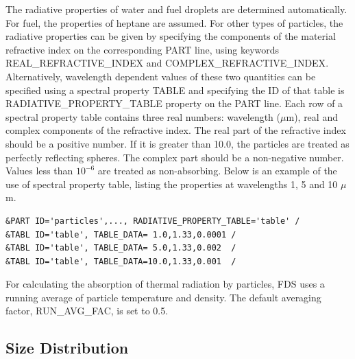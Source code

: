 \documentclass[11pt]{book}
\begin{document}
The radiative properties of water and fuel droplets are determined automatically.
For fuel, the properties of heptane are assumed. For other types of particles, the
radiative properties can be given by specifying the components of the material refractive index on the corresponding {\ct PART} line, using keywords
{\ct REAL\_REFRACTIVE\_INDEX} and {\ct COMPLEX\_REFRACTIVE\_INDEX}. Alternatively, wavelength dependent values of these two quantities can be specified using
a spectral property {\ct TABLE} and specifying the {\ct ID} of that table is {\ct RADIATIVE\_PROPERTY\_TABLE} property on the {\ct PART} line.
Each row of a spectral property table contains three real numbers: wavelength ($\mu$m), real and complex components of the refractive index.
The real part of the refractive index should be a positive number. If it is greater than 10.0, the particles are treated as perfectly reflecting spheres.
The complex part should be a non-negative number. Values less than $10^{-6}$ are treated as non-absorbing.
Below is an example of the use of spectral property table, listing the properties at wavelengths 1, 5 and 10 $\mu$m.

\begin{lstlisting}
&PART ID='particles',..., RADIATIVE_PROPERTY_TABLE='table' /
&TABL ID='table', TABLE_DATA= 1.0,1.33,0.0001 /
&TABL ID='table', TABLE_DATA= 5.0,1.33,0.002  /
&TABL ID='table', TABLE_DATA=10.0,1.33,0.001  /
\end{lstlisting}

\noindent
For calculating the absorption of thermal radiation by particles, FDS uses a running average of particle temperature and density. The default averaging factor, {\ct RUN\_AVG\_FAC}, is set to 0.5.


\subsection{Size Distribution}
\label{info:particle_size}
\end{document}
